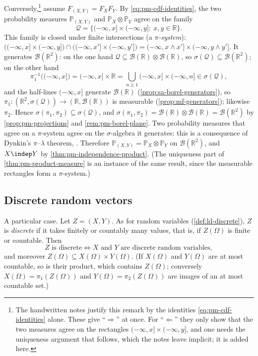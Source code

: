 \begin{remark}
Conversely,\footnote{The handwritten notes justify this remark by the identities
\eqref{eq:pm-cdf-identities} alone. These give ``$\Rightarrow$'' at once. For ``$\Leftarrow$''
they only show that the two measures agree on the rectangles $(-\infty,x]\times(-\infty,y]$,
and one needs the uniqueness argument that follows, which the notes leave implicit; it is
added here.} assume $F_{(X,Y)}=F_XF_Y$. By \eqref{eq:pm-cdf-identities}, the two probability
measures $\mathbb P_{(X,Y)}$ and $\mathbb P_X\otimes\mathbb P_Y$ agree on the family
\[
  \mathcal Q=\big\{(-\infty,x]\times(-\infty,y]:\ x,y\in\mathbb R\big\}.
\]
This family is closed under finite intersections (a \emph{$\pi$-system}):
$\big((-\infty,x]\times(-\infty,y]\big)\cap\big((-\infty,x']\times(-\infty,y']\big)
=(-\infty,x\wedge x']\times(-\infty,y\wedge y']$. It generates $\mathcal B(\mathbb R^2)$:
on the one hand $\mathcal Q\subseteq\mathcal B(\mathbb R)\otimes\mathcal B(\mathbb R)$, so
$\sigma(\mathcal Q)\subseteq\mathcal B(\mathbb R^2)$; on the other hand
\[
  \pi_1^{-1}\big((-\infty,x]\big)=(-\infty,x]\times\mathbb R
  =\bigcup_{n\ge1}(-\infty,x]\times(-\infty,n]\in\sigma(\mathcal Q),
\]
and the half-lines $(-\infty,x]$ generate $\mathcal B(\mathbb R)$
(\cref{prop:sa-borel-generators}), so $\pi_1:(\mathbb R^2,\sigma(\mathcal Q))\to(\mathbb
R,\mathcal B(\mathbb R))$ is measurable (\cref{prop:mf-generators}); likewise $\pi_2$. Hence
$\sigma(\pi_1,\pi_2)\subseteq\sigma(\mathcal Q)$, and
$\sigma(\pi_1,\pi_2)=\mathcal B(\mathbb R)\otimes\mathcal B(\mathbb R)=\mathcal B(\mathbb R^2)$
by \cref{prop:pm-projections} and \cref{rem:pm-borel-plane}. Two probability measures that
agree on a $\pi$-system agree on the $\sigma$-algebra it generates: this is a consequence of
Dynkin's $\pi$--$\lambda$ theorem, \citet[Theorem~3.3; for $\sigma$-finite measures,
Theorem~10.3]{billingsley}. Therefore $\mathbb P_{(X,Y)}=\mathbb P_X\otimes\mathbb P_Y$ on
$\mathcal B(\mathbb R^2)$, and $X\indep Y$ by \cref{thm:pm-independence-product}. (The
uniqueness part of \cref{thm:pm-product-measure} is an instance of the same result, since the
measurable rectangles form a $\pi$-system.)
\end{remark}

\subsection{Discrete random vectors}\label{sec:pm-discrete}

A particular case. Let $Z=(X,Y)$. As for random variables (\cref{def:ld-discrete}), $Z$ is
\emph{discrete} if it takes finitely or countably many values, that is, if $Z(\Omega)$ is
finite or countable. Then
\[
  Z\text{ is discrete}\iff X\text{ and }Y\text{ are discrete random variables},
\]
and moreover $Z(\Omega)\subseteq X(\Omega)\times Y(\Omega)$. (If $X(\Omega)$ and $Y(\Omega)$
are at most countable, so is their product, which contains $Z(\Omega)$; conversely
$X(\Omega)=\pi_1(Z(\Omega))$ and $Y(\Omega)=\pi_2(Z(\Omega))$ are images of an at most
countable set.)

